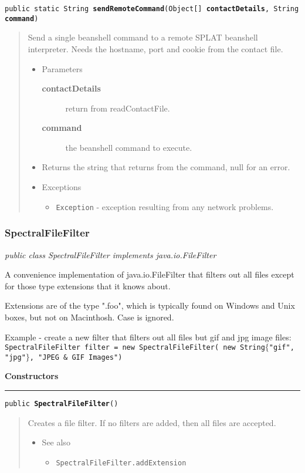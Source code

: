 \documentclass[twoside,11pt,nolof]{starlink}
\providecommand{\refdefined}[1]{}
\providecommand{\startsection}[4]{
   \subsubsection{\label{#3}{#2}}
   #4
}
\providecommand{\method}[1]{\texttt{#1}}
\newenvironment{desc}{\begin{quote}}{\end{quote}}
\providecommand{\constructors}{
   \par\textbf{\large{Constructors}}\\
   \hrule
}
\begin{document}
\method{public static String \textbf{sendRemoteCommand}(\texttt{Object[]} \textbf{contactDetails}, \texttt{String} \textbf{command})\label{l242}\label{l243}}
\begin{desc}Send a single beanshell command to a remote SPLAT beanshell
 interpreter. Needs the hostname, port and cookie from the
 contact file.
\begin{itemize}
\item{Parameters
  \begin{description}
   \item[\textbf{contactDetails}]{return from readContactFile.}
   \item[\textbf{command}]{the beanshell command to execute.}
  \end{description}}
\end{itemize}
\begin{itemize}
\item{Returns the string that returns from the command, null for an error. }
\item{{Exceptions}
  \begin{itemize}
   \item{\vspace{-.6ex}\texttt{Exception} - exception resulting from any network problems.}
  \end{itemize}
}
\end{itemize}
\end{desc}

\startsection{Class}{SpectralFileFilter}{l237}

\fbox{\parbox{\textwidth}{
\textit{public
 class SpectralFileFilter implements java.io.FileFilter}
}} %





{A convenience implementation of java.io.FileFilter that filters out
 all files except for those type extensions that it knows about.

 Extensions are of the type ".foo", which is typically found on
 Windows and Unix boxes, but not on Macinthosh. Case is ignored.

 Example - create a new filter that filters out all files
 but gif and jpg image files:
 \texttt{
\mbox{}\newline
    SpectralFileFilter filter = new SpectralFileFilter(\mbox{}\newline
                   new String$\{$"gif", "jpg"$\}$, "JPEG \& GIF Images")\mbox{}\newline
 }
}
\constructors
\method{public \textbf{SpectralFileFilter}()\label{l244}\label{l245}}
\begin{desc}Creates a file filter. If no filters are added, then all
 files are accepted.
\begin{itemize}
\item{{See also}
  \begin{itemize}
   \item{\texttt{SpectralFileFilter.addExtension} {
\refdefined{l246}}
}
  \end{itemize}
}
\end{itemize}
\end{desc}
\end{document}

